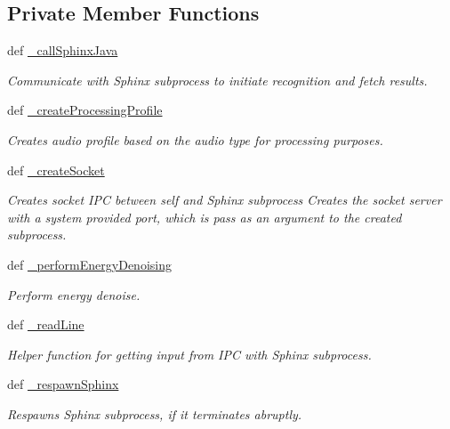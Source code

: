 \subsection*{Private Member Functions}
\begin{DoxyCompactItemize}
\item 
def \hyperlink{classrapp__speech__detection__sphinx4_1_1sphinx4__wrapper_1_1Sphinx4Wrapper_a9c2d4e36dea588b042ffdb1d05a04b9a}{\-\_\-call\-Sphinx\-Java}
\begin{DoxyCompactList}\small\item\em Communicate with Sphinx subprocess to initiate recognition and fetch results. \end{DoxyCompactList}\item 
def \hyperlink{classrapp__speech__detection__sphinx4_1_1sphinx4__wrapper_1_1Sphinx4Wrapper_a98ef1ddb945b8ba21b6aa5e0034561c2}{\-\_\-create\-Processing\-Profile}
\begin{DoxyCompactList}\small\item\em Creates audio profile based on the audio type for processing purposes. \end{DoxyCompactList}\item 
def \hyperlink{classrapp__speech__detection__sphinx4_1_1sphinx4__wrapper_1_1Sphinx4Wrapper_abfbb97cfec6c92e520dfe8733ca0a591}{\-\_\-create\-Socket}
\begin{DoxyCompactList}\small\item\em Creates socket I\-P\-C between self and Sphinx subprocess Creates the socket server with a system provided port, which is pass as an argument to the created subprocess. \end{DoxyCompactList}\item 
def \hyperlink{classrapp__speech__detection__sphinx4_1_1sphinx4__wrapper_1_1Sphinx4Wrapper_a850a6644cf5feb280c65f1f08466610c}{\-\_\-perform\-Energy\-Denoising}
\begin{DoxyCompactList}\small\item\em Perform energy denoise. \end{DoxyCompactList}\item 
def \hyperlink{classrapp__speech__detection__sphinx4_1_1sphinx4__wrapper_1_1Sphinx4Wrapper_ac6ca615b241514eb49192e2bda55750b}{\-\_\-read\-Line}
\begin{DoxyCompactList}\small\item\em Helper function for getting input from I\-P\-C with Sphinx subprocess. \end{DoxyCompactList}\item 
def \hyperlink{classrapp__speech__detection__sphinx4_1_1sphinx4__wrapper_1_1Sphinx4Wrapper_a442019ab62fa3ab63373f24bdcb60d63}{\-\_\-respawn\-Sphinx}
\begin{DoxyCompactList}\small\item\em Respawns Sphinx subprocess, if it terminates abruptly. \end{DoxyCompactList}\end{DoxyCompactItemize}
